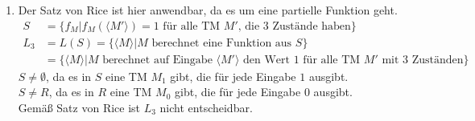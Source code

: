 \documentclass[a4paper,11pt]{scrartcl}
\begin{document}
\begin{enumerate}[label=(\alph*)]
	\item	Der Satz von Rice ist hier anwendbar, da es um eine partielle Funktion geht.\\
			\begin{align*}
			S &=\{f_M \vert f_M(\langle M' \rangle) = 1 \text{ für alle TM } M' \text{, die 3 Zustände haben}\}\\
			L_3 &= L(S) = \{\langle M \rangle \vert M \text{ berechnet eine Funktion aus } S\}\\
				&= \{\langle M \rangle \vert M \text{ berechnet auf Eingabe } \langle M' \rangle \text{ den Wert } 1 \text{ für alle TM } M' \text{ mit 3 Zuständen}\}
			\end{align*}
			$S \neq \emptyset$, da es in $S$ eine TM $M_1$ gibt, die für jede Eingabe $1$ ausgibt.\\
			$S \neq R$, da es in $R$ eine TM $M_0$ gibt, die für jede Eingabe $0$ ausgibt.\\
			Gemäß Satz von Rice ist $L_3$ nicht entscheidbar.
	
	\end{enumerate}
	
	
\end{document}

